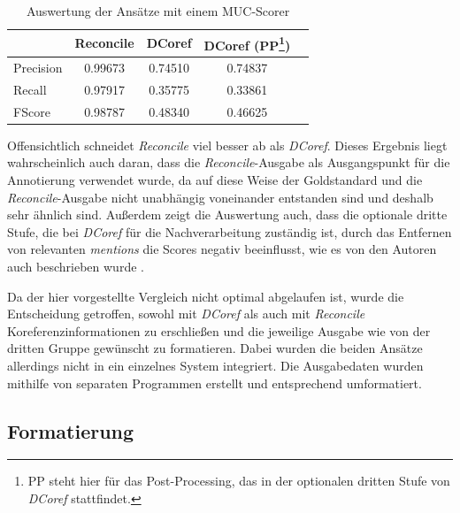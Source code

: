 \documentclass[a4paper,12pt,titlepage=true, ngerman]{scrartcl}
\begin{document}
\begin{savenotes}
	\begin{table}[ht]
		\centering
  		\begin{tabular}{ l || c | c | c ||  r }
						& Reconcile 	& DCoref 	& DCoref (PP\footnote[1]{PP steht hier für das Post-Processing, das in der optionalen dritten Stufe von \emph{DCoref} stattfindet.}) 	& \\ \hline \hline
    			Precision 	& 0.99673 	& 0.74510	& 0.74837		& \\ \hline
    			Recall     	& 0.97917 	& 0.35775 	& 0.33861 		& \\ \hline
    			FScore    	& 0.98787  	& 0.48340 	& 0.46625 		& \\ \hline
  		\end{tabular}
  		\caption{Auswertung der Ansätze mit einem MUC-Scorer}
  		\label{score:ergebnis}
	\end{table}
\end{savenotes}

Offensichtlich schneidet \emph{Reconcile} viel besser ab als \emph{DCoref}. Dieses Ergebnis liegt wahrscheinlich auch daran, dass die \emph{Reconcile}-Ausgabe als Ausgangspunkt für die Annotierung verwendet wurde, da auf diese Weise der Goldstandard und die \emph{Reconcile}-Ausgabe nicht unabhängig voneinander entstanden sind und deshalb sehr ähnlich sind. Außerdem zeigt die Auswertung auch, dass die optionale dritte Stufe, die bei \emph{DCoref} für die Nachverarbeitung zuständig ist, durch das Entfernen von relevanten \emph{mentions} die Scores negativ beeinflusst, wie es von den Autoren auch beschrieben wurde \autocite[29, 32]{chris_leeetal}.

Da der hier vorgestellte Vergleich nicht optimal abgelaufen ist, wurde die Entscheidung getroffen, sowohl mit \emph{DCoref} als auch mit \emph{Reconcile} Koreferenzinformationen zu erschließen und die jeweilige Ausgabe wie von der dritten Gruppe gewünscht zu formatieren. Dabei wurden die beiden Ansätze allerdings nicht in ein einzelnes System integriert. Die Ausgabedaten wurden mithilfe von separaten Programmen erstellt und entsprechend umformatiert.



\subsection{Formatierung}\label{Verlauf:Formatierung}%
\end{document}
